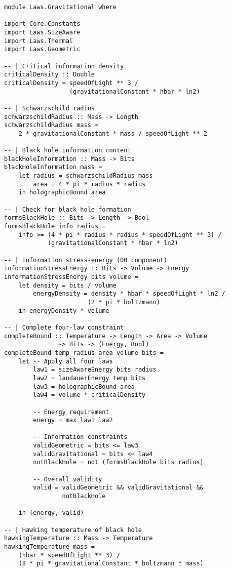 \documentclass[11pt,a4paper]{article}
\theoremstyle{definition}
\begin{document}
\begin{lstlisting}
module Laws.Gravitational where

import Core.Constants
import Laws.SizeAware
import Laws.Thermal
import Laws.Geometric

-- | Critical information density
criticalDensity :: Double
criticalDensity = speedOfLight ** 3 / 
                  (gravitationalConstant * hbar * ln2)

-- | Schwarzschild radius
schwarzschildRadius :: Mass -> Length
schwarzschildRadius mass = 
    2 * gravitationalConstant * mass / speedOfLight ** 2

-- | Black hole information content
blackHoleInformation :: Mass -> Bits
blackHoleInformation mass =
    let radius = schwarzschildRadius mass
        area = 4 * pi * radius * radius
    in holographicBound area

-- | Check for black hole formation
formsBlackHole :: Bits -> Length -> Bool
formsBlackHole info radius =
    info >= (4 * pi * radius * radius * speedOfLight ** 3) / 
            (gravitationalConstant * hbar * ln2)

-- | Information stress-energy (00 component)
informationStressEnergy :: Bits -> Volume -> Energy
informationStressEnergy bits volume =
    let density = bits / volume
        energyDensity = density * hbar * speedOfLight * ln2 / 
                       (2 * pi * boltzmann)
    in energyDensity * volume

-- | Complete four-law constraint
completeBound :: Temperature -> Length -> Area -> Volume 
               -> Bits -> (Energy, Bool)
completeBound temp radius area volume bits =
    let -- Apply all four laws
        law1 = sizeAwareEnergy bits radius
        law2 = landauerEnergy temp bits
        law3 = holographicBound area
        law4 = volume * criticalDensity
        
        -- Energy requirement
        energy = max law1 law2
        
        -- Information constraints
        validGeometric = bits <= law3
        validGravitational = bits <= law4
        notBlackHole = not (formsBlackHole bits radius)
        
        -- Overall validity
        valid = validGeometric && validGravitational && 
                notBlackHole
                
    in (energy, valid)

-- | Hawking temperature of black hole
hawkingTemperature :: Mass -> Temperature
hawkingTemperature mass =
    (hbar * speedOfLight ** 3) / 
    (8 * pi * gravitationalConstant * boltzmann * mass)


\end{lstlisting}
\end{document}
